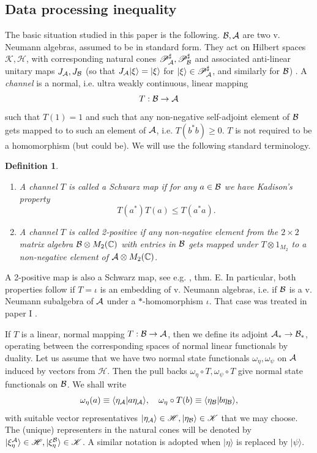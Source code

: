 \documentclass[english,a4paper,12pt]{article}
\newtheorem{definition}{Definition}
\def\sH{\mathscr{H}}
\def\sK{\mathscr{K}}
\def\sP{\mathscr{P}}
\def\cA{{\mathfrak A}}
\def\cB{{\mathfrak B}}
\newcommand{\ca}[1]{{\cal #1}}
\newcommand{\ben}{\begin{equation}}
\newcommand{\een}{\end{equation}}
\def\cA{{\ca A}}
\def\cB{{\ca B}}
\newcommand{\CC}{\mathbb{C}}
\begin{document}
\subsection{Data processing inequality}

The basic situation studied in this paper is the following. $\cB, \cA$ are two v. Neumann algebras, assumed to be in standard form. They act on Hilbert spaces $\sK, \sH$, 
with corresponding natural cones $\sP^\sharp_\cA, \sP^\sharp_\cB$ and associated anti-linear unitary maps $J_\cA, J_\cB$ (so that $J_\cA |\xi\rangle = |\xi\rangle$ for $|\xi\rangle \in \sP^\sharp_\cA$, and similarly for $\cB$) . 
A {\em channel} is a normal, i.e. ultra weakly continuous, linear mapping 
\ben
T: \cB \to \cA
\een
such that $T(1)=1$ and such that any non-negative self-adjoint element of $\cB$ gets mapped to to such an element of $\cA$, i.e. 
$T(b^*b) \ge 0$.
$T$ is not required to be a homomorphism (but could be). We will use the following standard terminology. 

\begin{definition}
\begin{enumerate}
\item 
A channel $T$ is called a Schwarz map if for any $a \in \cB$ we have Kadison's property
\ben\label{eq:eqschwarz}
T(a^*)T(a) \le T(a^*a).
\een
\item
A channel $T$ is called 2-positive if any non-negative element from 
the $2\times 2$ matrix algebra $\cB \otimes M_2(\CC)$ with entries in $\cB$ 
gets mapped under $T \otimes 1_{M_2}$ to a non-negative element of $\cA \otimes M_2(\CC)$.
\end{enumerate}
\end{definition}

A 2-positive map is also a Schwarz map, see e.g. \cite{Petz4}, thm. E. In particular, both properties follow if $T=\iota$ is 
an embedding of v. Neumann algebras, i.e. if $\cB$ is a v. Neumann subalgebra of $\cA$ under a $*$-homomorphism $\iota$.
That case was treated in paper I  \cite{Faulkner:2020iou}. 

If $T$ is a linear, normal mapping $T: \cB \to \cA$, then we define its adjoint ${\cA}_* \to {\cB}_*$, operating between 
the corresponding spaces of normal linear functionals by duality.
Let us assume that we have two normal state functionals $\omega_\eta, \omega_\psi$ on $\cA$ induced by vectors from $\sH$. 
Then the pull backs $ \omega_\eta \circ T, \omega_\psi \circ T$ give normal state functionals on $\cB$. We shall write 
\ben\label{eq:conventions}
\omega_\eta(a) \equiv \langle \eta_\cA | a \eta_\cA \rangle, \quad 
\omega_\eta \circ T(b) \equiv \langle \eta_\cB | b \eta_\cB \rangle, 
\een
with suitable vector representatives $|\eta_\cA\rangle \in \sH, |\eta_\cB\rangle \in \sK$ that we may choose. The (unique) representers  in the natural cones
will be denoted by $|\xi_{\eta}^\cA \rangle \in \sH, |\xi_{\eta}^\cB \rangle \in \sK$.
A similar notation is adopted when $|\eta\rangle$ is replaced by  $|\psi \rangle$. 
\end{document}
